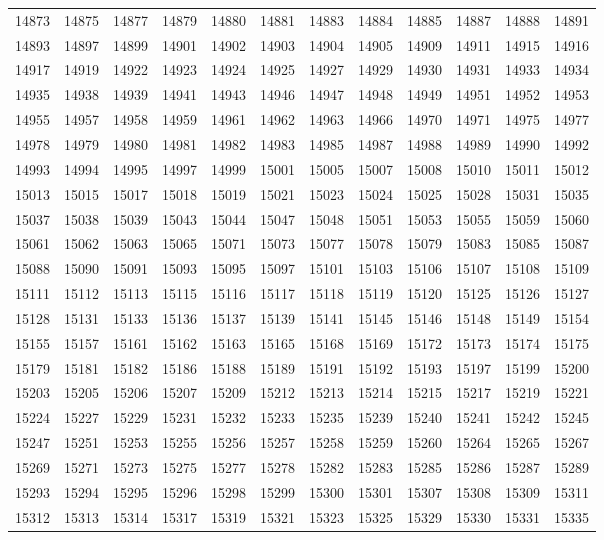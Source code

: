 \begin{center}
\begin{longtable}{llllllllllll}
14873 &14875 &14877 &14879 &14880 &14881 &14883 &14884 &14885 &14887 &14888 &14891 \\
14893 &14897 &14899 &14901 &14902 &14903 &14904 &14905 &14909 &14911 &14915 &14916 \\
14917 &14919 &14922 &14923 &14924 &14925 &14927 &14929 &14930 &14931 &14933 &14934 \\
14935 &14938 &14939 &14941 &14943 &14946 &14947 &14948 &14949 &14951 &14952 &14953 \\
14955 &14957 &14958 &14959 &14961 &14962 &14963 &14966 &14970 &14971 &14975 &14977 \\
14978 &14979 &14980 &14981 &14982 &14983 &14985 &14987 &14988 &14989 &14990 &14992 \\
14993 &14994 &14995 &14997 &14999 &15001 &15005 &15007 &15008 &15010 &15011 &15012 \\
15013 &15015 &15017 &15018 &15019 &15021 &15023 &15024 &15025 &15028 &15031 &15035 \\
15037 &15038 &15039 &15043 &15044 &15047 &15048 &15051 &15053 &15055 &15059 &15060 \\
15061 &15062 &15063 &15065 &15071 &15073 &15077 &15078 &15079 &15083 &15085 &15087 \\
15088 &15090 &15091 &15093 &15095 &15097 &15101 &15103 &15106 &15107 &15108 &15109 \\
15111 &15112 &15113 &15115 &15116 &15117 &15118 &15119 &15120 &15125 &15126 &15127 \\
15128 &15131 &15133 &15136 &15137 &15139 &15141 &15145 &15146 &15148 &15149 &15154 \\
15155 &15157 &15161 &15162 &15163 &15165 &15168 &15169 &15172 &15173 &15174 &15175 \\
15179 &15181 &15182 &15186 &15188 &15189 &15191 &15192 &15193 &15197 &15199 &15200 \\
15203 &15205 &15206 &15207 &15209 &15212 &15213 &15214 &15215 &15217 &15219 &15221 \\
15224 &15227 &15229 &15231 &15232 &15233 &15235 &15239 &15240 &15241 &15242 &15245 \\
15247 &15251 &15253 &15255 &15256 &15257 &15258 &15259 &15260 &15264 &15265 &15267 \\
15269 &15271 &15273 &15275 &15277 &15278 &15282 &15283 &15285 &15286 &15287 &15289 \\
15293 &15294 &15295 &15296 &15298 &15299 &15300 &15301 &15307 &15308 &15309 &15311 \\
15312 &15313 &15314 &15317 &15319 &15321 &15323 &15325 &15329 &15330 &15331 &15335 \\

\end{longtable}
\end{center}
